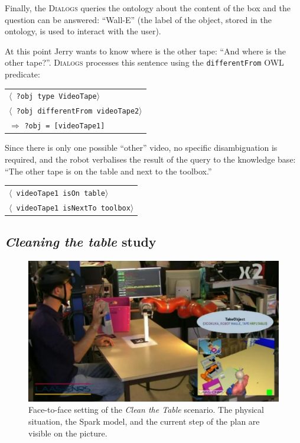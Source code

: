 \documentclass[preprint,3p,times]{elsarticle}
\newcommand{\concept}[1]{{\small \texttt{#1}}}
\newcommand{\stmt}[1]{{\footnotesize \tt $\langle$ #1\relax$\rangle$}}
\begin{document}
Finally, the \textsc{Dialogs} queries the ontology about the content of the box
and the question can be answered: ``Wall-E'' (the label of the object, stored in the
ontology, is used to interact with the user).


At this point Jerry wants to know where is the other tape: ``And where is the
other tape?''. \textsc{Dialogs} processes this sentence using the
\concept{differentFrom} OWL predicate:

\begin{center}
\begin{tabular}{l}
\stmt{?obj type VideoTape}\\
\stmt{?obj differentFrom videoTape2}\\
\hspace{0.7cm}$\Rightarrow$ \concept{?obj = [videoTape1]}
\end{tabular}
\end{center}

Since there is only one possible ``other'' video, no specific disambiguation is
required, and the robot verbalises the result of the query to the knowledge
base: ``The other tape is on the table and next to the toolbox.''

\begin{center}
\begin{tabular}{l}
\stmt{videoTape1 isOn table}\\
\stmt{videoTape1 isNextTo toolbox}
\end{tabular}
\end{center}


\subsection{\emph{Cleaning the table} study}

\begin{figure}[ht!]
    \centering
    \includegraphics[width=0.6\columnwidth]{cleantable.jpg}

    \caption{Face-to-face setting of the \emph{Clean the Table} scenario. The
    physical situation, the {\sc Spark} model, and the current step of the plan
    are visible on the picture.}

    \label{fig|cleantable-video}
\end{figure}
\end{document}
